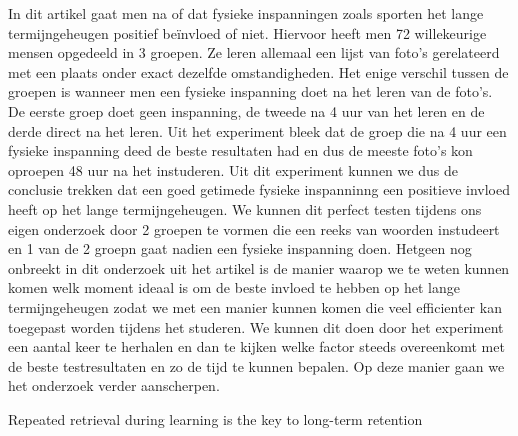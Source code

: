 \documentclass{hogent-article}
\begin{document}
	In dit artikel gaat men na of dat fysieke inspanningen zoals sporten het lange termijngeheugen positief beïnvloed of niet. Hiervoor heeft men 72 willekeurige mensen opgedeeld in 3 groepen. Ze leren allemaal een lijst van foto’s gerelateerd met een plaats onder exact dezelfde omstandigheden. Het enige verschil tussen de groepen is wanneer men een fysieke inspanning doet na het leren van de foto’s. De eerste groep doet geen inspanning, de tweede na 4 uur van het leren en de derde direct na het leren. Uit het experiment bleek dat de groep die na 4 uur een fysieke inspanning deed de beste resultaten had en dus de meeste foto’s kon oproepen 48 uur na het instuderen. Uit dit experiment kunnen we dus de conclusie trekken dat een goed getimede fysieke inspanninng een positieve invloed heeft op het lange termijngeheugen. We kunnen dit perfect testen tijdens ons eigen onderzoek door 2 groepen te vormen die een reeks van woorden instudeert en 1 van de 2 groepn gaat nadien een fysieke inspanning doen. Hetgeen nog onbreekt in dit onderzoek uit het artikel is de manier waarop we te weten kunnen komen welk moment ideaal is om de beste invloed te hebben op het lange termijngeheugen zodat we met een manier kunnen komen die veel efficienter kan toegepast worden tijdens het studeren. We kunnen dit doen door het experiment een aantal keer te herhalen en dan te kijken welke factor steeds overeenkomt met de beste testresultaten en zo de tijd te kunnen bepalen. Op deze manier gaan we het onderzoek verder aanscherpen.
	
	Repeated retrieval during learning is the key to long-term retention \autocite{Karpicke2007}
	
\end{document}
